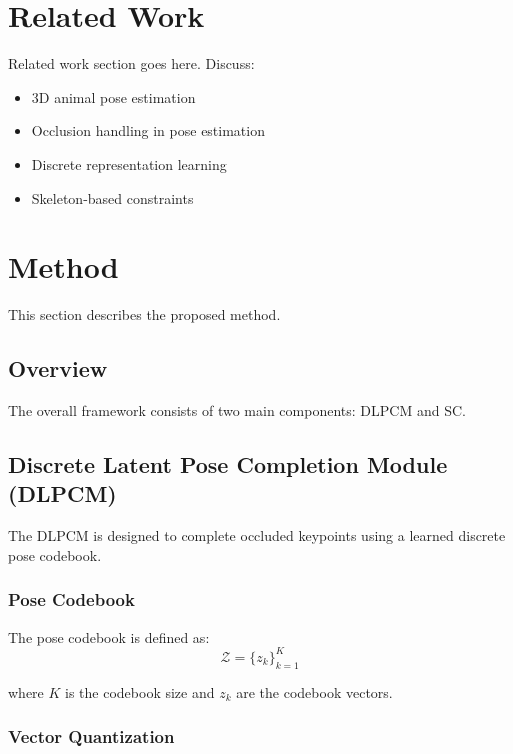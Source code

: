 \documentclass[runningheads]{llncs}
\begin{document}
%
\section{Related Work}
\label{sec:related}

Related work section goes here. Discuss:
\begin{itemize}
\item 3D animal pose estimation
\item Occlusion handling in pose estimation
\item Discrete representation learning
\item Skeleton-based constraints
\end{itemize}

%
\section{Method}
\label{sec:method}

This section describes the proposed method.

\subsection{Overview}

The overall framework consists of two main components: DLPCM and SC.

\subsection{Discrete Latent Pose Completion Module (DLPCM)}
\label{subsec:dlpcm}

The DLPCM is designed to complete occluded keypoints using a learned discrete 
pose codebook.

\subsubsection{Pose Codebook}

The pose codebook is defined as:
\begin{equation}
\mathcal{Z} = \{z_k\}_{k=1}^{K}
\label{eq:codebook}
\end{equation}

where $K$ is the codebook size and $z_k$ are the codebook vectors.

\subsubsection{Vector Quantization}
\end{document}

